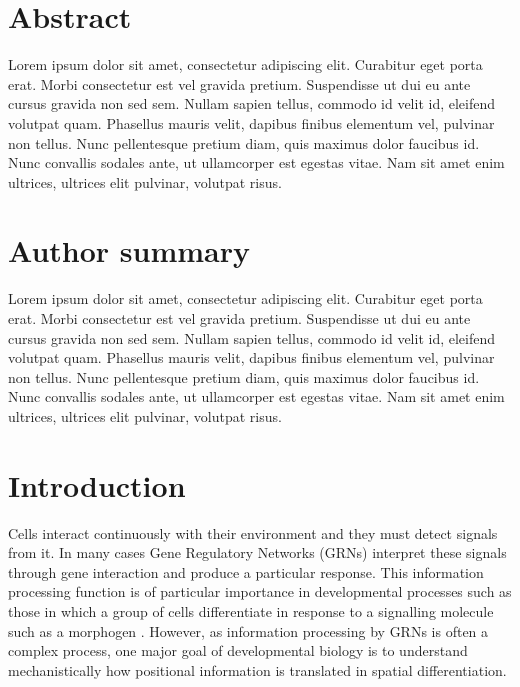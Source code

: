\documentclass[10pt,letterpaper]{article}
\begin{document}
\section*{Abstract}
Lorem ipsum dolor sit amet, consectetur adipiscing elit. Curabitur eget porta 
erat. Morbi consectetur est vel gravida pretium. Suspendisse ut dui eu ante 
cursus gravida non sed sem. Nullam sapien tellus, commodo id velit id, eleifend 
volutpat quam. Phasellus mauris velit, dapibus finibus elementum vel, pulvinar 
non tellus. Nunc pellentesque pretium diam, quis maximus dolor faucibus id. Nunc
convallis sodales ante, ut ullamcorper est egestas vitae. Nam sit amet enim 
ultrices, ultrices elit pulvinar, volutpat risus.


\section*{Author summary}
Lorem ipsum dolor sit amet, consectetur adipiscing elit. Curabitur eget porta 
erat. Morbi consectetur est vel gravida pretium. Suspendisse ut dui eu ante 
cursus gravida non sed sem. Nullam sapien tellus, commodo id velit id, eleifend 
volutpat quam. Phasellus mauris velit, dapibus finibus elementum vel, pulvinar 
non tellus. Nunc pellentesque pretium diam, quis maximus dolor faucibus id. Nunc
convallis sodales ante, ut ullamcorper est egestas vitae. Nam sit amet enim 
ultrices, ultrices elit pulvinar, volutpat risus.

\linenumbers

\section*{Introduction}

Cells interact continuously with their environment and they must detect signals
from it. In many cases Gene Regulatory Networks (GRNs) interpret these signals
through gene interaction and produce a particular response. This information
processing function is of particular importance in developmental processes such
as those in which a group of cells differentiate in response to a signalling
molecule such as a morphogen \cite{Turing1952, Wolpert1969}. However, as
information processing by GRNs is often a complex process, one major goal of
developmental biology is to understand mechanistically how positional
information is translated in spatial differentiation.\\
\end{document}
